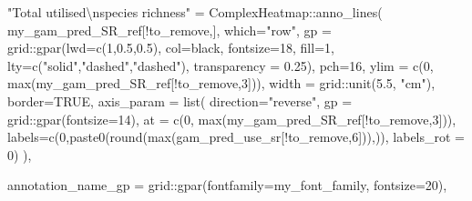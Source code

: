 \documentclass[
]{article}
\newenvironment{Shaded}{\begin{snugshade}}{\end{snugshade}}
\newcommand{\AttributeTok}[1]{\textcolor[rgb]{0.77,0.63,0.00}{#1}}
\newcommand{\ConstantTok}[1]{\textcolor[rgb]{0.00,0.00,0.00}{#1}}
\newcommand{\DecValTok}[1]{\textcolor[rgb]{0.00,0.00,0.81}{#1}}
\newcommand{\FloatTok}[1]{\textcolor[rgb]{0.00,0.00,0.81}{#1}}
\newcommand{\FunctionTok}[1]{\textcolor[rgb]{0.00,0.00,0.00}{#1}}
\newcommand{\NormalTok}[1]{#1}
\newcommand{\OtherTok}[1]{\textcolor[rgb]{0.56,0.35,0.01}{#1}}
\newcommand{\SpecialCharTok}[1]{\textcolor[rgb]{0.00,0.00,0.00}{#1}}
\newcommand{\StringTok}[1]{\textcolor[rgb]{0.31,0.60,0.02}{#1}}
\begin{document}
\begin{Shaded}
\begin{Highlighting}[]
  \StringTok{"Total utilised}\SpecialCharTok{\textbackslash{}n}\StringTok{species richness"} \OtherTok{=}\NormalTok{ ComplexHeatmap}\SpecialCharTok{::}\FunctionTok{anno\_lines}\NormalTok{(}
\NormalTok{    my\_gam\_pred\_SR\_ref[}\SpecialCharTok{!}\NormalTok{to\_remove,],}
            \AttributeTok{which=}\StringTok{"row"}\NormalTok{,}
          \AttributeTok{gp =}\NormalTok{ grid}\SpecialCharTok{::}\FunctionTok{gpar}\NormalTok{(}\AttributeTok{lwd=}\FunctionTok{c}\NormalTok{(}\DecValTok{1}\NormalTok{,}\FloatTok{0.5}\NormalTok{,}\FloatTok{0.5}\NormalTok{),}
                          \AttributeTok{col=}\StringTok{\textquotesingle{}black\textquotesingle{}}\NormalTok{,}
                          \AttributeTok{fontsize=}\DecValTok{18}\NormalTok{,}
                          \AttributeTok{fill=}\DecValTok{1}\NormalTok{, }\AttributeTok{lty=}\FunctionTok{c}\NormalTok{(}\StringTok{"solid"}\NormalTok{,}\StringTok{"dashed"}\NormalTok{,}\StringTok{"dashed"}\NormalTok{),}
                          \AttributeTok{transparency =} \FloatTok{0.25}\NormalTok{),}
          \AttributeTok{pch=}\DecValTok{16}\NormalTok{,}
          \AttributeTok{ylim =} \FunctionTok{c}\NormalTok{(}\DecValTok{0}\NormalTok{, }\FunctionTok{max}\NormalTok{(my\_gam\_pred\_SR\_ref[}\SpecialCharTok{!}\NormalTok{to\_remove,}\DecValTok{3}\NormalTok{])),}
          \AttributeTok{width =}\NormalTok{ grid}\SpecialCharTok{::}\FunctionTok{unit}\NormalTok{(}\FloatTok{5.5}\NormalTok{, }\StringTok{"cm"}\NormalTok{),}
          \AttributeTok{border=}\ConstantTok{TRUE}\NormalTok{,}
          \AttributeTok{axis\_param =} \FunctionTok{list}\NormalTok{(}
            \AttributeTok{direction=}\StringTok{"reverse"}\NormalTok{,}
            \AttributeTok{gp =}\NormalTok{ grid}\SpecialCharTok{::}\FunctionTok{gpar}\NormalTok{(}\AttributeTok{fontsize=}\DecValTok{14}\NormalTok{),}
            \AttributeTok{at =} \FunctionTok{c}\NormalTok{(}\DecValTok{0}\NormalTok{, }\FunctionTok{max}\NormalTok{(my\_gam\_pred\_SR\_ref[}\SpecialCharTok{!}\NormalTok{to\_remove,}\DecValTok{3}\NormalTok{])),}
            \AttributeTok{labels=}\FunctionTok{c}\NormalTok{(}\StringTok{\textquotesingle{}0\textquotesingle{}}\NormalTok{,}\FunctionTok{paste0}\NormalTok{(}\FunctionTok{round}\NormalTok{(}\FunctionTok{max}\NormalTok{(gam\_pred\_use\_sr[}\SpecialCharTok{!}\NormalTok{to\_remove,}\DecValTok{6}\NormalTok{])),}\StringTok{\textquotesingle{}\textquotesingle{}}\NormalTok{)),}
            \AttributeTok{labels\_rot =} \DecValTok{0}\NormalTok{)}
\NormalTok{  ),}

  \AttributeTok{annotation\_name\_gp =}\NormalTok{ grid}\SpecialCharTok{::}\FunctionTok{gpar}\NormalTok{(}\AttributeTok{fontfamily=}\NormalTok{my\_font\_family, }\AttributeTok{fontsize=}\DecValTok{20}\NormalTok{),}


\end{Highlighting}
\end{Shaded}
\end{document}
